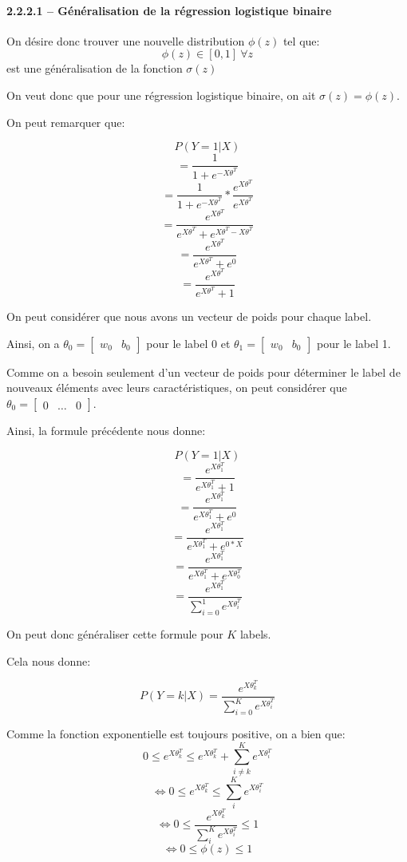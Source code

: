 \documentclass[
]{article}
\begin{document}
\paragraph{2.2.2.1 -- Généralisation de la régression logistique
binaire}\label{guxe9nuxe9ralisation-de-la-ruxe9gression-logistique-binaire}

On désire donc trouver une nouvelle distribution \(\phi(z)\) tel que:
\[\phi(z) \in [0, 1]\ \forall z\] est une généralisation de la fonction
\(\sigma(z)\)

On veut donc que pour une régression logistique binaire, on ait
\(\sigma(z) = \phi(z)\).

On peut remarquer que:

\[P(Y = 1 | X)\] \[=\frac{1}{1 + e^{-X \theta^T}}\]
\[=\frac{1}{1 + e^{-X \theta^T}} * \frac{e^{X \theta^T}}{e^{X \theta^T}}\]
\[=\frac{e^{X \theta^T}}{e^{X \theta^T} + e^{X \theta^T - X \theta^T}}\]
\[=\frac{e^{X \theta^T}}{e^{X \theta^T} + e^0}\]
\[=\frac{e^{X \theta^T}}{e^{X \theta^T} + 1}\]

On peut considérer que nous avons un vecteur de poids pour chaque label.

Ainsi, on a \(\theta_0 = \begin{bmatrix} w_0 & b_0 \end{bmatrix}\) pour
le label 0 et \(\theta_1 = \begin{bmatrix} w_0 & b_0 \end{bmatrix}\)
pour le label 1.

Comme on a besoin seulement d'un vecteur de poids pour déterminer le
label de nouveaux éléments avec leurs caractéristiques, on peut
considérer que
\(\theta_0 = \begin{bmatrix} 0 & \dots & 0 \end{bmatrix}\).

Ainsi, la formule précédente nous donne:

\[P(Y = 1 | X)\] \[=\frac{e^{X \theta_1^T}}{e^{X \theta_1^T} + 1}\]
\[=\frac{e^{X \theta_1^T}}{e^{X \theta_1^T} + e^0}\]
\[=\frac{e^{X \theta_1^T}}{e^{X \theta_1^T} + e^{0 * X}}\]
\[=\frac{e^{X \theta_1^T}}{e^{X \theta_1^T} + e^{X \theta_0^T}}\]
\[=\frac{e^{X \theta_1^T}}{\sum_{i = 0}^1 e^{X \theta_i^T}}\]

On peut donc généraliser cette formule pour \(K\) labels.

Cela nous donne:

\[P(Y = k| X )=\frac{e^{X \theta_k^T}}{\sum_{i = 0}^K e^{X \theta_i^T}}\]

Comme la fonction exponentielle est toujours positive, on a bien que:
\[0 \leq e^{X \theta_k^T} \leq e^{X \theta_k^T} + \sum_{i \neq k}^K e^{X \theta_i^T}\]
\[\Leftrightarrow 0 \leq e^{X \theta_k^T} \leq \sum_{i}^K e^{X \theta_i^T}\]
\[\Leftrightarrow 0 \leq \frac{e^{X \theta_k^T}}{\sum_{i}^K e^{X \theta_i^T}} \leq 1\]
\[\Leftrightarrow 0 \leq \phi(z) \leq 1\]
\end{document}
